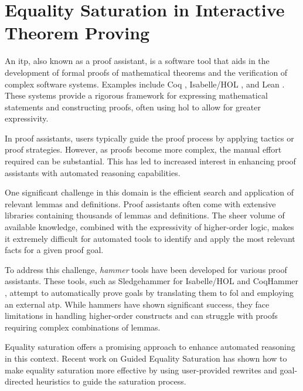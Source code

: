 
\section{Equality Saturation in Interactive Theorem Proving}

An \gls{itp}, also known as a proof assistant, is a software tool that aids in the development of formal proofs of mathematical theorems and the verification of complex software systems.
Examples include Coq \cite{Coq:manual}, Isabelle/HOL \cite{Book2002:Nipkow}, and Lean \cite{lean}. 
These systems provide a rigorous framework for expressing mathematical statements and constructing proofs, often using \gls{hol} to allow for greater expressivity.

In proof assistants, users typically guide the proof process by applying tactics or proof strategies. 
However, as proofs become more complex, the manual effort required can be substantial. 
This has led to increased interest in enhancing proof assistants with automated reasoning capabilities.

One significant challenge in this domain is the efficient search and application of relevant lemmas and definitions. 
Proof assistants often come with extensive libraries containing thousands of lemmas and definitions. 
The sheer volume of available knowledge, combined with the expressivity of higher-order logic, makes it extremely difficult for automated tools to identify and apply the most relevant facts for a given proof goal.

To address this challenge, \emph{hammer} tools have been developed for various proof assistants. 
These tools, such as Sledgehammer for Isabelle/HOL \cite{sledgehammer} and CoqHammer \cite{coqhammer}, attempt to automatically prove goals by translating them to \gls{fol} and employing an external \gls{atp}. 
While hammers have shown significant success, they face limitations in handling higher-order constructs and can struggle with proofs requiring complex combinations of lemmas.

Equality saturation offers a promising approach to enhance automated reasoning in this context.
Recent work on Guided Equality Saturation \cite{guidedeqsat} has shown how to make equality saturation more effective by using user-provided rewrites and goal-directed heuristics to guide the saturation process.

